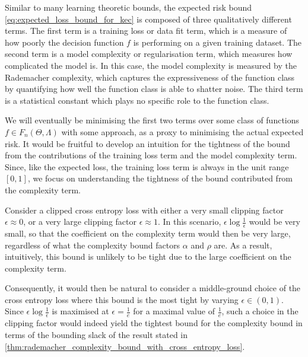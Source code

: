\documentclass{article}
\begin{document}
		Similar to many learning theoretic bounds, the expected risk bound \eqref{eq:expected_loss_bound_for_kec} is composed of three qualitatively different terms. The first term is a training loss or data fit term, which is a measure of how poorly the decision function $f$ is performing on a given training dataset. The second term is a model complexity or regularisation term, which measures how complicated the model is. In this case, the model complexity is measured by the Rademacher complexity, which captures the expressiveness of the function class by quantifying how well the function class is able to shatter noise. The third term is a statistical constant which plays no specific role to the function class.
		
		We will eventually be minimising the first two terms over some class of functions $f \in F_{n}(\Theta, \Lambda)$ with some approach, as a proxy to minimising the actual expected risk. It would be fruitful to develop an intuition for the tightness of the bound from the contributions of the training loss term and the model complexity term. Since, like the expected loss, the training loss term is always in the unit range $[0, 1]$, we focus on understanding the tightness of the bound contributed from the complexity term.
		
		Consider a clipped cross entropy loss with either a very small clipping factor $\epsilon \approx 0$, or a very large clipping factor $\epsilon \approx 1$. In this scenario, $\epsilon \log{\frac{1}{\epsilon}}$ would be very small, so that the coefficient on the complexity term would then be very large, regardless of what the complexity bound factors $\alpha$ and $\rho$ are. As a result, intuitively, this bound is unlikely to be tight due to the large coefficient on the complexity term.
		
		Consequently, it would then be natural to consider a middle-ground choice of the cross entropy loss where this bound is the most tight by varying $\epsilon \in (0, 1)$. Since $\epsilon \log{\frac{1}{\epsilon}}$ is maximised at $\epsilon = \frac{1}{e}$ for a maximal value of $\frac{1}{e}$, such a choice in the clipping factor would indeed yield the tightest bound for the complexity bound in terms of the bounding slack of the result stated in \cref{thm:rademacher_complexity_bound_with_cross_entropy_loss}.
		 
\end{document}
